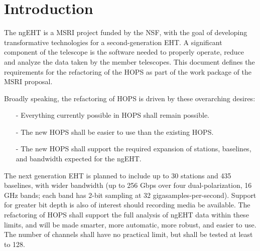 %
%

\section{Introduction}
\label{sec:intro}


The \ac{ngEHT} is a \ac{MSRI} project funded by the \ac{NSF}, with the goal of developing
transformative technologies for a second-generation \ac{EHT}. A significant
component of the telescope is the software needed to properly
operate, reduce and analyze the data taken by the member telescopes.
This document defines the requirements for the refactoring of the \ac{HOPS}
as part of the work package of the \acs{MSRI} proposal. 

Broadly speaking, the refactoring of \acs{HOPS} is driven by
these overarching desires:

\begin{itemize}
\item[-] Everything currently possible in \ac{HOPS} shall remain possible.

\item[-] The new \ac{HOPS} shall be easier to use than the existing \acs{HOPS}.
 
\item[-] The new \acs{HOPS} shall support the required expansion of stations, 
baselines, and bandwidth expected for the ngEHT.

\end{itemize}

The next generation \acs{EHT} is planned to include up to 30 stations
and 435 baselines, with wider bandwidth (up to 256 Gbps over four dual-polarization, 16 GHz bands; each band has 2-bit sampling at 32 gigasamples-per-second). 
Support for greater bit depth is also of interest should recording media be available.  The refactoring
of \ac{HOPS} shall support the full analysis of ngEHT data within these limits,
and will be made smarter, more automatic, more robust, and easier to use. The
number of channels shall have no practical limit, but shall be tested at least to 128.

